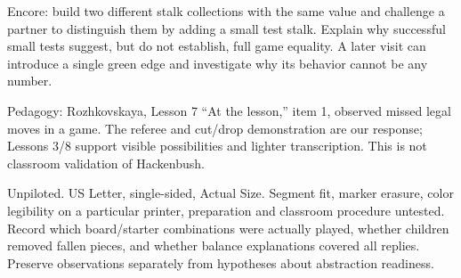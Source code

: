 \documentclass[11pt,letterpaper]{article}
\begin{document}
Encore: build two different stalk collections with the same value and challenge a partner to distinguish them by adding a small test stalk. Explain why successful small tests suggest, but do not establish, full game equality. A later visit can introduce a single green edge and investigate why its behavior cannot be any number.

Pedagogy: Rozhkovskaya, Lesson 7 ``At the lesson,'' item 1, observed missed legal moves in a game. The referee and cut/drop demonstration are our response; Lessons 3/8 support visible possibilities and lighter transcription. This is not classroom validation of Hackenbush.

Unpiloted. US Letter, single-sided, Actual Size. Segment fit, marker erasure, color legibility on a particular printer, preparation and classroom procedure untested. Record which board/starter combinations were actually played, whether children removed fallen pieces, and whether balance explanations covered all replies. Preserve observations separately from hypotheses about abstraction readiness.
\end{document}
